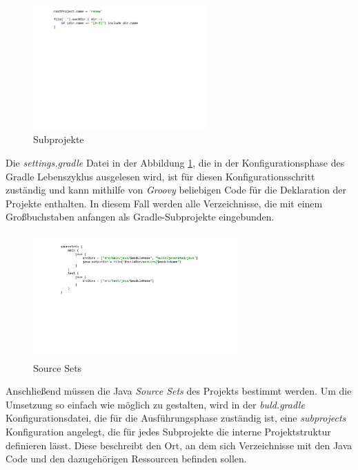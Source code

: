 	\begin{figure}[h!]
	  \centering
	  \includegraphics[width=0.6\textwidth]{material/images/settingsgradle.pdf}
	  \caption{Subprojekte}
	  \label{fig:subprojekte}
	\end{figure}

 	Die \textit{settings.gradle} Datei in der Abbildung \ref{fig:subprojekte}, die in der Konfigurationsphase des Gradle Lebenszyklus ausgelesen wird, ist für diesen Konfigurationsschritt zuständig und kann mithilfe von \textit{Groovy} beliebigen Code für die Deklaration der Projekte enthalten. In diesem Fall werden alle Verzeichnisse, die mit einem Großbuchstaben anfangen als Gradle-Subprojekte eingebunden.\bigbreak

	\begin{figure}[h!]
	  \centering
	  \includegraphics[width=0.7\textwidth]{material/images/sourcesets.pdf}
	  \caption{Source Sets}
	  \label{fig:Source_Sets}
	\end{figure}

 	Anschließend müssen die Java \textit{Source Sets} des Projekts bestimmt werden. Um die Umsetzung so einfach wie möglich zu gestalten, wird in der \textit{buld.gradle} Konfigurationsdatei, die für die Ausführungsphase zuständig ist, eine \textit{subprojects} Konfiguration angelegt, die für jedes Subprojekte die interne Projektstruktur definieren lässt. Diese beschreibt den Ort, an dem sich  Verzeichnisse mit den Java Code und den dazugehörigen Ressourcen befinden sollen.\bigbreak

